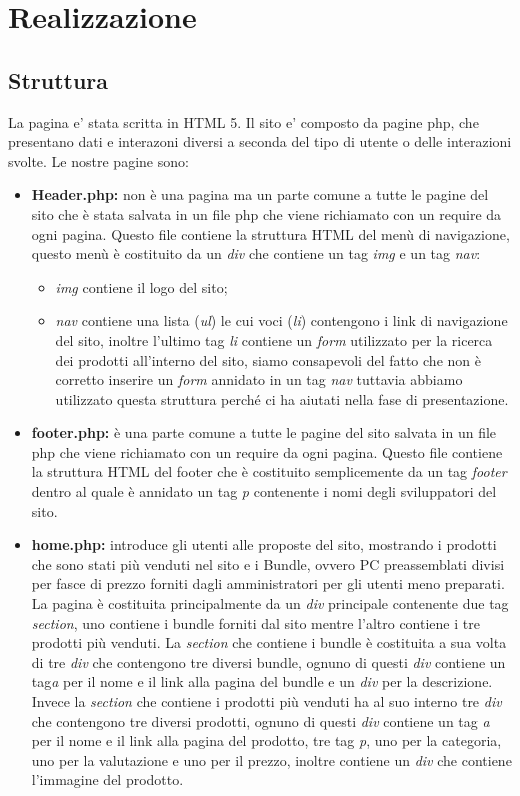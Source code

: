 \section{Realizzazione}
\subsection{Struttura}
La pagina e' stata scritta in HTML 5.\newline
Il sito e' composto da pagine php, che presentano dati e interazoni diversi a seconda del tipo di utente o delle interazioni svolte.
Le nostre pagine sono:
\begin{itemize}
	
 \item \textbf{Header.php:} non è una pagina ma un parte comune a tutte le pagine del sito che è stata salvata in un file php che viene richiamato con un require da ogni pagina. Questo file contiene la struttura HTML del menù di navigazione, questo menù è costituito da un \emph{div} che contiene un tag \emph{img} e un tag \emph{nav}:
 \begin{itemize}
 	\item \emph{img} contiene il logo del sito;
 	\item \emph{nav} contiene una lista (\emph{ul}) le cui voci (\emph{li}) contengono i link di navigazione del sito, inoltre l'ultimo tag \emph{li} contiene un \emph{form} utilizzato per la ricerca dei prodotti all'interno del sito, siamo consapevoli del fatto che non è corretto inserire un \emph{form} annidato in un tag \emph{nav} tuttavia abbiamo utilizzato questa struttura perché ci ha aiutati nella fase di presentazione.
 \end{itemize}

 \item \textbf{footer.php:} è una parte comune a tutte le pagine del sito salvata in un file php che viene richiamato con un require da ogni pagina.
 Questo file contiene la struttura HTML del footer che è costituito semplicemente da un tag \emph{footer} dentro al quale è annidato un tag \emph{p} contenente i nomi degli sviluppatori del sito. 
	
 \item \textbf{home.php:} introduce gli utenti alle proposte del sito, mostrando i prodotti che sono stati più venduti nel sito e i Bundle, ovvero PC preassemblati divisi per fasce di prezzo forniti dagli amministratori per gli utenti meno preparati.
 La pagina è costituita principalmente da un \emph{div} principale contenente due tag \emph{section}, uno contiene i bundle forniti dal sito mentre l'altro contiene i tre prodotti più venduti. 
 La \emph{section} che contiene i bundle è costituita a sua volta di tre \emph{div} che contengono tre diversi bundle, ognuno di questi \emph{div} contiene un tag\emph{a} per il nome e il link alla pagina del bundle e un \emph{div} per la descrizione.
 Invece la \emph{section} che contiene i prodotti più venduti ha al suo interno tre \emph{div} che contengono tre diversi prodotti, ognuno di questi \emph{div} contiene un tag \emph{a} per il nome e il link alla pagina del prodotto, tre tag \emph{p}, uno per la categoria, uno per la valutazione e uno per il prezzo, inoltre contiene un \emph{div} che contiene l'immagine del prodotto.
 

\end{itemize}
